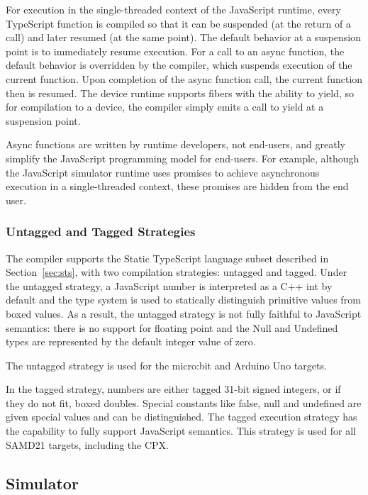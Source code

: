 For execution in the single-threaded context of the JavaScript runtime,
every TypeScript function is compiled so that it can be suspended (at the return of a call) and later resumed (at the same point).
The default behavior at a suspension point is to immediately resume execution.  For a call to an async function,
the default behavior is overridden by the compiler, which suspends execution of the current function.
Upon completion of the async function call, the current function then is resumed.
The \CO device runtime supports fibers with the ability to yield, so for compilation to a device,
the compiler simply emits a call to yield at a suspension point.

Async functions are written by runtime developers, not end-users, and greatly simplify the JavaScript
programming model for end-users. For example, although the JavaScript simulator runtime uses promises to
achieve asynchronous execution in a single-threaded context, these promises are hidden from the end user.

\subsubsection{Untagged and Tagged Strategies}\label{sec:untagged-tagged}

The \MC compiler supports the Static TypeScript language subset described in Section~\ref{sec:sts},
with two compilation strategies: untagged and tagged. Under the untagged strategy,
a JavaScript number is interpreted as a C++ int by default and the type system is used
to statically distinguish primitive values from boxed values. As a result, the untagged
strategy is not fully faithful to JavaScript semantics: there is no support for floating
point and the Null and Undefined types are represented by the default integer value of zero.

The untagged strategy is used for the micro:bit and Arduino Uno targets.

In the tagged strategy, numbers are either tagged 31-bit signed integers, or if they do not fit,
boxed doubles. Special constants like false, null and undefined are given special values
and can be distinguished. The tagged execution strategy has the capability to fully support
JavaScript semantics. This strategy is used for all SAMD21 targets, including the CPX.

\subsection{Simulator}


